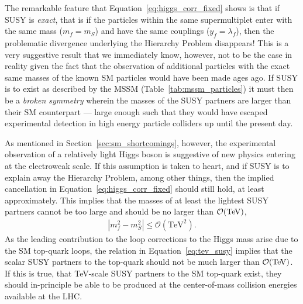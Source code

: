 The remarkable feature that Equation~\ref{eq:higgs_corr_fixed} shows is that if SUSY is \textit{exact}, that is if the particles within the same supermultiplet 
enter with the same mass ($m_f = m_S$) and have the same couplings ($y_f = \lambda_f$), then the problematic divergence underlying the Hierarchy Problem
disappears!
This is a very suggestive result that we immediately know, however, not to be the case
in reality given the fact that
the observation of additional particles with the exact same masses of the known SM particles would
have been made ages ago.
If SUSY is to exist as described by the MSSM (Table~\ref{tab:mssm_particles}) it must then
be a \textit{broken symmetry} wherein the masses of the SUSY partners are larger than
their SM counterpart --- large enough such that they would have escaped experimental detection
in high energy particle colliders up until the present day.

As mentioned in Section~\ref{sec:sm_shortcomings}, however, the experimental observation of a relatively
light Higgs boson is suggestive of new physics entering at the electroweak scale.
If this assumption is taken to heart, and if SUSY is to explain away the Hierarchy Problem, among other things,
then the implied cancellation in Equation~\ref{eq:higgs_corr_fixed} should still hold, at least approximately.
This implies that the masses of at least the lightest SUSY partners cannot be too large
and should be no larger than $\mathcal{O}(\text{Te\kern -0.1em V})$,
\begin{align}
    |m_f^2 - m_S^2| \le \mathcal{O}(\text{TeV}^2).
    \label{eq:tev_susy}
\end{align}
As the leading contribution to the loop corrections to the Higgs mass arise due to the SM top-quark loops,
the relation in Equation~\ref{eq:tev_susy} implies that the scalar SUSY partners to the top-quark should
not be much larger than $\mathcal{O}(\text{Te\kern -0.1em V})$.
If this is true, that TeV-scale SUSY partners to the SM top-quark exist, they should in-principle
be able to be produced at the center-of-mass collision energies available at the LHC.

